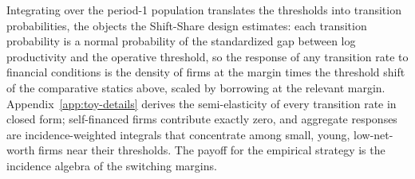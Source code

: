 \documentclass[12pt]{article}
\begin{document}
Integrating over the period-1 population translates the thresholds into transition probabilities, the objects the Shift-Share design estimates: each transition probability is a normal probability of the standardized gap between log productivity and the operative threshold, so the response of any transition rate to financial conditions is the density of firms at the margin times the threshold shift of the comparative statics above, scaled by borrowing at the relevant margin. Appendix~\ref{app:toy-details} derives the semi-elasticity of every transition rate in closed form; self-financed firms contribute exactly zero, and aggregate responses are incidence-weighted integrals that concentrate among small, young, low-net-worth firms near their thresholds. The payoff for the empirical strategy is the incidence algebra of the switching margins.
 
\end{document}
